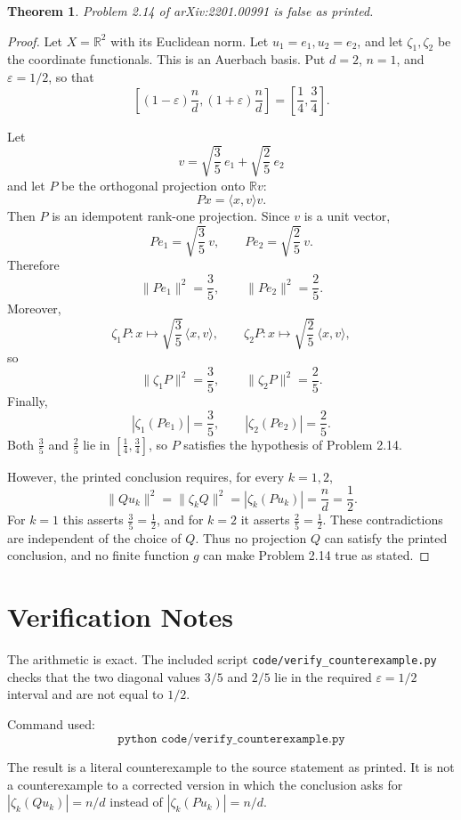 \documentclass[11pt]{article}
\newtheorem{theorem}{Theorem}
\begin{document}
\begin{theorem}
Problem 2.14 of arXiv:2201.00991 is false as printed.
\end{theorem}

\begin{proof}
Let \(X=\mathbb R^2\) with its Euclidean norm.  Let
\(u_1=e_1,u_2=e_2\), and let \(\zeta_1,\zeta_2\) be the coordinate
functionals.  This is an Auerbach basis.  Put \(d=2\), \(n=1\), and
\(\varepsilon=1/2\), so that
\[
\left[(1-\varepsilon)\frac nd,(1+\varepsilon)\frac nd\right]
= \left[\frac14,\frac34\right].
\]

Let
\[
v=\sqrt{\frac35}\,e_1+\sqrt{\frac25}\,e_2
\]
and let \(P\) be the orthogonal projection onto \(\mathbb R v\):
\[
P x=\langle x,v\rangle v.
\]
Then \(P\) is an idempotent rank-one projection.  Since \(v\) is a unit vector,
\[
Pe_1=\sqrt{\frac35}\,v,\qquad
Pe_2=\sqrt{\frac25}\,v.
\]
Therefore
\[
\|Pe_1\|^2=\frac35,\qquad \|Pe_2\|^2=\frac25.
\]
Moreover,
\[
\zeta_1P:x\mapsto \sqrt{\frac35}\,\langle x,v\rangle,\qquad
\zeta_2P:x\mapsto \sqrt{\frac25}\,\langle x,v\rangle,
\]
so
\[
\|\zeta_1P\|^2=\frac35,\qquad \|\zeta_2P\|^2=\frac25.
\]
Finally,
\[
|\zeta_1(Pe_1)|=\frac35,\qquad |\zeta_2(Pe_2)|=\frac25.
\]
Both \(\frac35\) and \(\frac25\) lie in \([\frac14,\frac34]\), so \(P\)
satisfies the hypothesis of Problem 2.14.

However, the printed conclusion requires, for every \(k=1,2\),
\[
\|Qu_k\|^2=\|\zeta_kQ\|^2=|\zeta_k(Pu_k)|=\frac nd=\frac12.
\]
For \(k=1\) this asserts \(\frac35=\frac12\), and for \(k=2\) it asserts
\(\frac25=\frac12\).  These contradictions are independent of the choice of
\(Q\).  Thus no projection \(Q\) can satisfy the printed conclusion, and no
finite function \(g\) can make Problem 2.14 true as stated.
\end{proof}

\section*{Verification Notes}

The arithmetic is exact.  The included script
\texttt{code/verify\_counterexample.py} checks that the two diagonal values
\(3/5\) and \(2/5\) lie in the required \(\varepsilon=1/2\) interval and are
not equal to \(1/2\).

Command used:
\[
\texttt{python code/verify\_counterexample.py}
\]

The result is a literal counterexample to the source statement as printed.
It is not a counterexample to a corrected version in which the conclusion asks
for \(|\zeta_k(Qu_k)|=n/d\) instead of \(|\zeta_k(Pu_k)|=n/d\).
\end{document}
